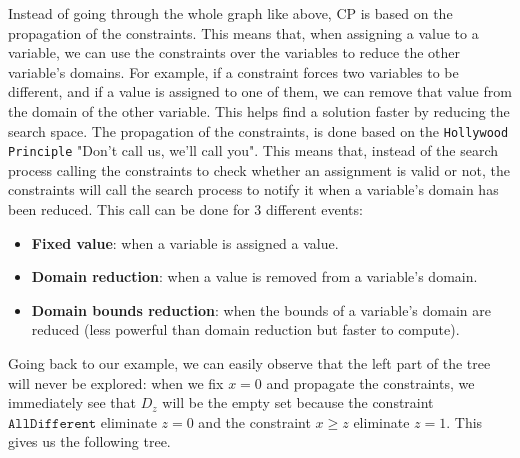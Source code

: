 \documentclass[12pt, openany]{report}
\theoremstyle{definition}
\begin{document}
Instead of going through the whole graph like above, CP is based on the propagation of the constraints. This means that, when assigning a value to a variable, we can use the constraints over the variables to reduce the other variable's domains. For example, if a constraint forces two variables to be different, and if a value is assigned to one of them, we can remove that value from the domain of the other variable. This helps find a solution faster by reducing the search space. The propagation of the constraints, is done based on the \texttt{Hollywood Principle} "Don't call us, we'll call you". This means that, instead of the search process calling the constraints to check whether an assignment is valid or not, the constraints will call the search process to notify it when a variable's domain has been reduced. This call can be done for 3 different events:
\begin{itemize}
    \item \textbf{Fixed value}: when a variable is assigned a value.
    \item \textbf{Domain reduction}: when a value is removed from a variable's domain.
    \item \textbf{Domain bounds reduction}: when the bounds of a variable's domain are reduced (less powerful than domain reduction but faster to compute).
\end{itemize} 
Going back to our example, we can easily observe that the left part of the tree will never be explored: when we fix $x=0$ and propagate the constraints, we immediately see that $D_z$ will be the empty set because the constraint $\texttt{AllDifferent}$ eliminate $z=0$ and the constraint $x \geq z$ eliminate $z=1$. This gives us the following tree.
\end{document}
